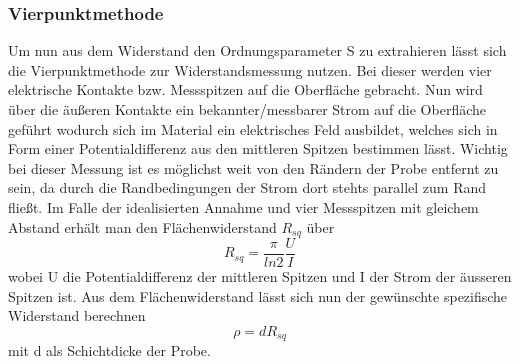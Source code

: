         \subsubsection{Vierpunktmethode}   
            Um nun aus dem Widerstand den Ordnungsparameter S zu extrahieren lässt sich die Vierpunktmethode
            zur Widerstandsmessung nutzen. Bei dieser werden vier elektrische Kontakte bzw. Messspitzen auf die 
            Oberfläche gebracht. Nun wird über die äußeren Kontakte ein bekannter/messbarer Strom auf die Oberfläche
            geführt wodurch sich im Material ein elektrisches Feld ausbildet, welches sich in Form einer 
            Potentialdifferenz aus den mittleren Spitzen bestimmen lässt.
            Wichtig bei dieser Messung ist es möglichst weit von den Rändern der Probe entfernt zu sein, da durch die Randbedingungen der
            Strom dort stehts parallel zum Rand fließt. Im Falle der idealisierten Annahme und vier Messspitzen 
            mit gleichem Abstand erhält man den Flächenwiderstand $R_{sq}$ über
            \begin{equation}
                R_{sq} = \frac{\pi}{ln2}\frac{U}{I}
            \end{equation}
            wobei U die Potentialdifferenz der mittleren Spitzen und I der Strom der äusseren Spitzen ist.
            Aus dem Flächenwiderstand lässt sich nun der gewünschte spezifische Widerstand berechnen
            \begin{equation}
                \rho = d R_{sq}
            \end{equation}
            mit d als Schichtdicke der Probe.
